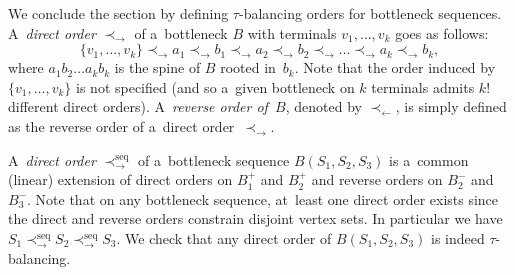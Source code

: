 \documentclass[a4paper,UKenglish,cleveref,hyperref,autoref]{lipics-v2021}
\begin{document}
We conclude the section by defining $\tau$-balancing orders for bottleneck sequences.
A~\emph{direct order} $\prec_{\rightarrow}$ of a~bottleneck $B$ with terminals $v_1, \dots, v_k$ goes as follows:
$$
\{v_1, \dots, v_k\} \prec_{\rightarrow} a_1 \prec_{\rightarrow} b_1 \prec_{\rightarrow} a_2 \prec_{\rightarrow} b_2 \prec_{\rightarrow} \dots \prec_{\rightarrow} a_k \prec_{\rightarrow} b_k,
$$
where $a_1b_2 \dots a_kb_k$ is the spine of $B$ rooted in~$b_k$.
Note that the order induced by $\{v_1, \dots, v_k\}$ is not specified (and so a~given bottleneck on $k$ terminals admits $k!$ different direct orders).
A~\emph{reverse order of~$B$}, denoted by $\prec_{\leftarrow}$, is simply defined as the reverse order of a~direct order~$\prec_{\rightarrow}$.

A~\emph{direct order} $\prec^\text{seq}_{\rightarrow}$ of a~bottleneck sequence $B(S_1, S_2, S_3)$ is a~common (linear) extension of direct orders on $B_1^+$ and $B_2^+$ and reverse orders on $B_2^-$ and $B_3^-$.
Note that on any bottleneck sequence, at~least one direct order exists since the direct and reverse orders constrain disjoint vertex sets. 
In particular we have $S_1 \prec^\text{seq}_{\rightarrow} S_2 \prec^\text{seq}_{\rightarrow} S_3$.
We check that any direct order of $B(S_1, S_2, S_3)$ is indeed $\tau$-balancing.
\end{document}

